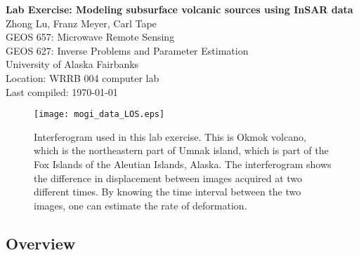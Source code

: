 \documentclass[11pt,titlepage,fleqn]{article}
\begin{document}

\begin{spacing}{1.2}
\centering
{\large \bf Lab Exercise: Modeling subsurface volcanic sources using InSAR data} \\
Zhong Lu, Franz Meyer, Carl Tape %
\\
GEOS 657: Microwave Remote Sensing \\
GEOS 627: Inverse Problems and Parameter Estimation \\
University of Alaska Fairbanks \\
Location: WRRB 004 computer lab \\
Last compiled: \today
\end{spacing}


\begin{figure}[h]
\centering
\texttt{[image: mogi\_data\_LOS.eps]}
\caption[]
{{
Interferogram used in this lab exercise. This is Okmok volcano, which is the northeastern part of Umnak island, which is part of the Fox Islands of the Aleutian Islands, Alaska. The interferogram shows the difference in displacement between images acquired at two different times. By knowing the time interval between the two images, one can estimate the rate of deformation.
\label{data}
}}
\end{figure}


\subsection*{Overview}
\end{document}
